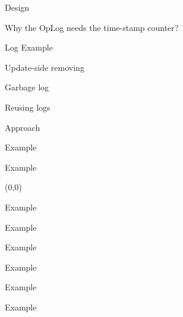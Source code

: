 \documentclass[english]{beamer} %
\begin{document}
\begin{frame}{Design}
\end{frame}



\begin{frame}{Why the OpLog needs the time-stamp counter?}
\end{frame}



\begin{frame}{Log Example}
\end{frame}




\begin{frame}{Update-side removing}
\end{frame}


\begin{frame}{Garbage log}
\end{frame}


\begin{frame}{Reusing logs}
\end{frame}


\begin{frame}{Approach}
\end{frame}


\begin{frame}{Example}
\end{frame}


\begin{frame}{Example}
\begin{textblock}{1}(0,0)
\end{textblock}
\end{frame}

\begin{frame}{Example}
\end{frame}

\begin{frame}{Example}
\end{frame}

\begin{frame}{Example}
\end{frame}

\begin{frame}{Example}
\end{frame}

\begin{frame}{Example}
\end{frame}

\begin{frame}{Example}
\end{frame}
\end{document}
